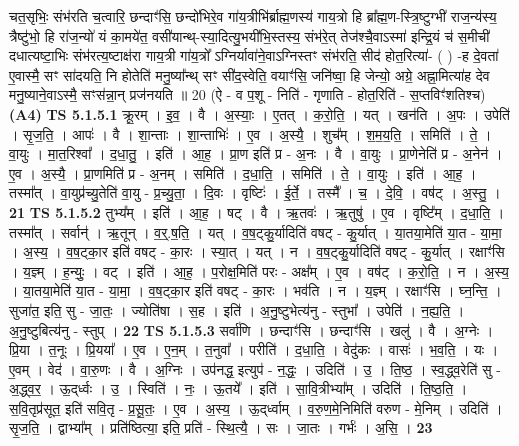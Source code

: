 \documentclass[17pt]{extarticle}
\begin{document}
                  \newline
                      चत॒सृभिः॒ संभ॑रति च॒त्वारि॒ छन्दाꣳ॑सि॒ छन्दो॑भिरे॒व गा॑य॒त्रीभि॑र्ब्राह्म॒णस्य॑ गाय॒त्रो हि ब्रा᳚ह्म॒ण-स्त्रि॒ष्टुग्भी॑ राज॒न्य॑स्य॒ त्रैष्टु॑भो॒ हि रा॑ज॒न्यो॑ यं का॒मये॑त॒ वसी॑यान्थ्-स्या॒दित्यु॒भयी॑भि॒स्तस्य॒ संभ॑रे॒त् तेज॑श्चै॒वाऽस्मा॑ इन्द्रि॒यं च॑ स॒मीची॑ दधात्यष्टा॒भिः संभ॑रत्य॒ष्टाक्ष॑रा गाय॒त्री गा॑य॒त्रो᳚ ऽग्निर्यावा॑ने॒वाऽग्निस्तꣳ संभ॑रति॒ सीद॑ होत॒रित्या॑- ( ) -ह दे॒वता॑ ए॒वास्मै॒ सꣳ सा॑दयति॒ नि होतेति॑ मनु॒ष्या᳚न्थ् सꣳ सी॑द॒स्वेति॒ वयाꣳ॑सि॒ जनि॑ष्वा॒ हि जेन्यो॒ अग्रे॒ अह्ना॒मित्या॑ह देव मनु॒ष्याने॒वाऽस्मै॒ सꣳस॑न्ना॒न् प्रज॑नयति ॥ 20 (ऐ - व प॒शू - निति॑ - गृणाति - होत॒रिति॑ - स॒प्तविꣳ॑शतिश्च)  \textbf{(A4)} \newline \newline
                                \textbf{ TS 5.1.5.1} \newline
                  क्रू॒रम् । इ॒व॒ । वै । अ॒स्याः॒ । ए॒तत् । क॒रो॒ति॒ । यत् । खन॑ति । अ॒पः । उपेति॑ । सृ॒ज॒ति॒ । आपः॑ । वै । शा॒न्ताः । शा॒न्ताभिः॑ । ए॒व । अ॒स्यै॒ । शुच᳚म् । श॒म॒य॒ति॒ । समिति॑ । ते॒ । वा॒युः । मा॒त॒रिश्वा᳚ । द॒धा॒तु॒ । इति॑ । आ॒ह॒ । प्रा॒ण इति॑ प्र - अ॒नः । वै । वा॒युः । प्रा॒णेनेति॑ प्र - अ॒नेन॑ । ए॒व । अ॒स्यै॒ । प्रा॒णमिति॑ प्र - अ॒नम् । समिति॑ । द॒धा॒ति॒ । समिति॑ । ते॒ । वा॒युः । इति॑ । आ॒ह॒ । तस्मा᳚त् । वा॒युप्र॑च्यु॒तेति॑ वा॒यु - प्र॒च्यु॒ता॒ । दि॒वः । वृष्टिः॑ । ई॒र्ते॒ । तस्मै᳚ । च॒ । दे॒वि॒ । वष॑ट् । अ॒स्तु॒ । \textbf{  21} \newline
                  \newline
                                \textbf{ TS 5.1.5.2} \newline
                  तुभ्य᳚म् । इति॑ । आ॒ह॒ । षट् । वै । ऋ॒तवः॑ । ऋ॒तुषु॑ । ए॒व । वृष्टि᳚म् । द॒धा॒ति॒ । तस्मा᳚त् । सर्वान्॑ । ऋ॒तून् । व॒र्॒.ष॒ति॒ । यत् । व॒ष॒ट्कु॒र्यादिति॑ वषट् - कु॒र्यात् । या॒तया॒मेति॑ या॒त - या॒मा॒ । अ॒स्य॒ । व॒ष॒ट्का॒र इति॑ वषट् - का॒रः । स्या॒त् । यत् । न । व॒ष॒ट्कु॒र्यादिति॑ वषट् - कु॒र्यात् । रक्षाꣳ॑सि । य॒ज्ञ्म् । ह॒न्युः॒ । वट् । इति॑ । आ॒ह॒ । प॒रोक्ष॒मिति॑ परः - अक्ष᳚म् । ए॒व । वष॑ट् । क॒रो॒ति॒ । न । अ॒स्य॒ । या॒तया॒मेति॑ या॒त - या॒मा॒ । व॒ष॒ट्का॒र इति॑ वषट् - का॒रः । भव॑ति । न । य॒ज्ञ्म् । रक्षाꣳ॑सि । घ्न॒न्ति॒ । सुजा॑त॒ इति॒ सु - जा॒तः॒ । ज्योति॑षा । स॒ह । इति॑ । अ॒नु॒ष्टुभेत्य॑नु - स्तुभा᳚ । उपेति॑ । न॒ह्य॒ति॒ । अ॒नु॒ष्टुबित्य॑नु - स्तुप् । \textbf{  22} \newline
                  \newline
                                \textbf{ TS 5.1.5.3} \newline
                  सर्वा॑णि । छन्दाꣳ॑सि । छन्दाꣳ॑सि । खलु॑ । वै । अ॒ग्नेः । प्रि॒या । त॒नूः । प्रि॒यया᳚ । ए॒व । ए॒न॒म् । त॒नुवा᳚ । परीति॑ । द॒धा॒ति॒ । वेदु॑कः । वासः॑ । भ॒व॒ति॒ । यः । ए॒वम् । वेद॑ । वा॒रु॒णः । वै । अ॒ग्निः । उप॑नद्ध॒ इत्युप॑ - न॒द्धः॒ । उदिति॑ । उ॒ । ति॒ष्ठ॒ । स्व॒द्ध्व॒रेति॑ सु - अ॒द्ध्व॒र॒ । ऊ॒द्‌र्ध्वः । उ॒ । स्विति॑ । नः॒ । ऊ॒तये᳚ । इति॑ । सा॒वि॒त्रीभ्या᳚म् । उदिति॑ । ति॒ष्ठ॒ति॒ । स॒वि॒तृप्र॑सूत॒ इति॑ सवि॒तृ - प्र॒सू॒तः॒ । ए॒व । अ॒स्य॒ । ऊ॒द्‌र्ध्वाम् । व॒रु॒ण॒मे॒निमिति॑ वरुण - मे॒निम् । उदिति॑ । सृ॒ज॒ति॒ । द्वाभ्या᳚म् । प्रति॑ष्ठित्या॒ इति॒ प्रति॑ - स्थि॒त्यै॒ । सः । जा॒तः । गर्भः॑ । अ॒सि॒ । \textbf{  23} \newline
\end{document}
